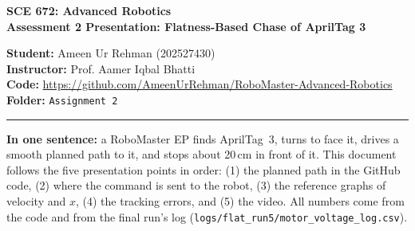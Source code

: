 \documentclass[11pt,a4paper]{article}
\begin{document}
\begin{center}
{\LARGE\bfseries SCE 672: Advanced Robotics}\\[5pt]
{\large\bfseries Assessment 2 Presentation: Flatness-Based Chase of AprilTag 3}
\end{center}
\noindent\textbf{Student:} Ameen Ur Rehman (202527430)\\
\textbf{Instructor:} Prof. Aamer Iqbal Bhatti\\
\textbf{Code:} \url{https://github.com/AmeenUrRehman/RoboMaster-Advanced-Robotics}\\
\textbf{Folder:} \texttt{Assignment 2}
\par\vspace{2pt}\noindent\rule{\linewidth}{0.8pt}

\textbf{In one sentence:} a RoboMaster EP finds AprilTag~3, turns to face it, drives a smooth planned path to it, and stops about 20\,cm in front of it.
This document follows the five presentation points in order: (1) the planned path in the GitHub code, (2) where the command is sent to the robot, (3) the reference graphs of velocity and $x$, (4) the tracking errors, and (5) the video.
All numbers come from the code and from the final run's log (\texttt{logs/flat\_run5/motor\_voltage\_log.csv}).

\end{document}
